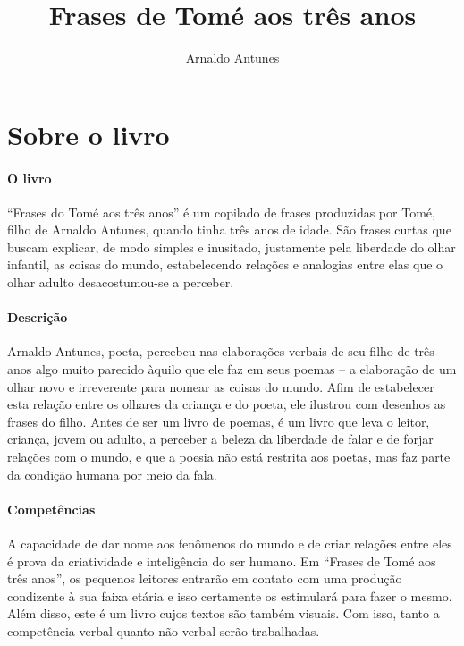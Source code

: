 \documentclass[11pt]{extarticle}
\newcommand{\AutorLivro}{Arnaldo Antunes}
\newcommand{\TituloLivro}{Frases de Tomé aos três anos}
\newcommand{\colaborador}{{Paulo Pompermaier, Renier Silva}}
\begin{document}
\title{\TituloLivro}
\author{\AutorLivro}
\def\authornotes{\colaborador}

\date{}
\maketitle


\tableofcontents



\section{Sobre o livro}

\paragraph{O livro} ``Frases do Tomé aos três anos'' é um copilado de frases 
produzidas por Tomé, filho de Arnaldo Antunes, quando tinha três anos de idade. 
São frases curtas que buscam explicar, de modo simples e inusitado, justamente 
pela liberdade do olhar infantil, as coisas do mundo, estabelecendo relações e 
analogias entre elas que o olhar adulto desacostumou-se a perceber.

\paragraph{Descrição} Arnaldo Antunes, poeta, percebeu nas elaborações
verbais de seu filho de três anos algo muito parecido àquilo que ele faz em seus 
 poemas – a elaboração de um olhar novo e irreverente para nomear as coisas do mundo. 
 Afim de estabelecer esta relação entre os olhares da criança e do poeta,
 ele ilustrou com desenhos as frases do filho. Antes de ser um livro de poemas, 
 é um livro que leva o leitor, criança, jovem ou adulto, a perceber a beleza da 
 liberdade de falar e de forjar relações com o mundo, e que a poesia não está 
 restrita aos poetas, mas faz parte da condição humana por meio da fala. 

\paragraph{Competências} A capacidade de dar nome aos fenômenos do mundo e de
criar relações entre eles é prova da criatividade e inteligência do ser humano.
Em ``Frases de Tomé aos três anos'', os pequenos leitores entrarão em contato
com uma produção condizente à sua faixa etária e isso certamente os 
estimulará para fazer o mesmo. Além disso, este é um livro cujos textos são 
também visuais. Com isso, tanto a competência verbal quanto não verbal serão trabalhadas.
\end{document}
